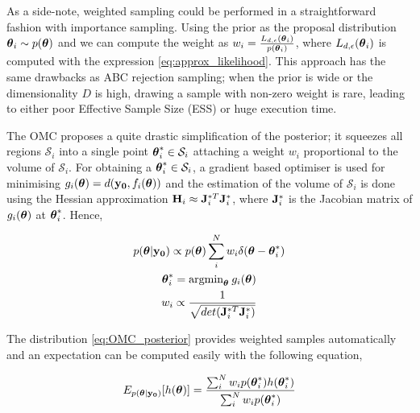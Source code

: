 As a side-note, weighted sampling could be performed in a
straightforward fashion with importance sampling. Using the prior as
the proposal distribution $\boldsymbol{\theta}_i \sim p(\boldsymbol{\theta})$ and we can
compute the weight as
$w_i = \frac{L_{d,\epsilon}(\boldsymbol{\theta}_i)}{p(\boldsymbol{\theta}_i)}$, where
$L_{d,\epsilon}(\boldsymbol{\theta}_i)$ is computed with the expression
\eqref{eq:approx_likelihood}. This approach has the same drawbacks as
ABC rejection sampling; when the prior is wide or the dimensionality
$D$ is high, drawing a sample with non-zero weight is rare, leading to
either poor Effective Sample Size (ESS) or huge execution time.

The OMC proposes a quite drastic simplification of the posterior; it
squeezes all regions $\mathcal{S}_i$ into a single point
$\boldsymbol{\theta}_i^* \in \mathcal{S}_i$ attaching a weight $w_i$ proportional
to the volume of $\mathcal{S}_i$. For obtaining a
$\boldsymbol{\theta}_i^* \in \mathcal{S}_i$, a gradient based optimiser is used
for minimising $g_i(\boldsymbol{\theta}) = d(\mathbf{y_0}, f_i(\boldsymbol{\theta}))$ and the
estimation of the volume of $\mathcal{S}_i$ is done using the Hessian
approximation $\mathbf{H}_i \approx \mathbf{J}_i^{*T}\mathbf{J}_i^*$, where $\mathbf{J}_i^*$
is the Jacobian matrix of $g_i(\boldsymbol{\theta})$ at $\boldsymbol{\theta}_i^*$. Hence,

\begin{gather} \label{eq:OMC_posterior}
    p(\boldsymbol{\theta}|\mathbf{y_0}) \propto p(\boldsymbol{\theta}) \sum_i^N w_i \delta(\boldsymbol{\theta} - \boldsymbol{\theta}_i^*)\\
  \boldsymbol{\theta}_i^* = \text{argmin}_{\boldsymbol{\theta}} \:g_i(\boldsymbol{\theta}) \\
  w_i \propto \frac{1}{\sqrt{det( \mathbf{J}_i^{*T}\mathbf{J}_i^*)}}
\end{gather}

The distribution \eqref{eq:OMC_posterior} provides weighted samples
automatically and an expectation can be computed easily with the
following equation,

\begin{equation}
  \label{eq:OMC_expectation}
  E_{p(\boldsymbol{\theta}|\mathbf{y_0})}[h(\boldsymbol{\theta})] = \frac{\sum_i^N w_i p(\boldsymbol{\theta}_i^*)h(\boldsymbol{\theta}_i^*)}{\sum_i^N w_i p(\boldsymbol{\theta}_i^*)}
\end{equation}
